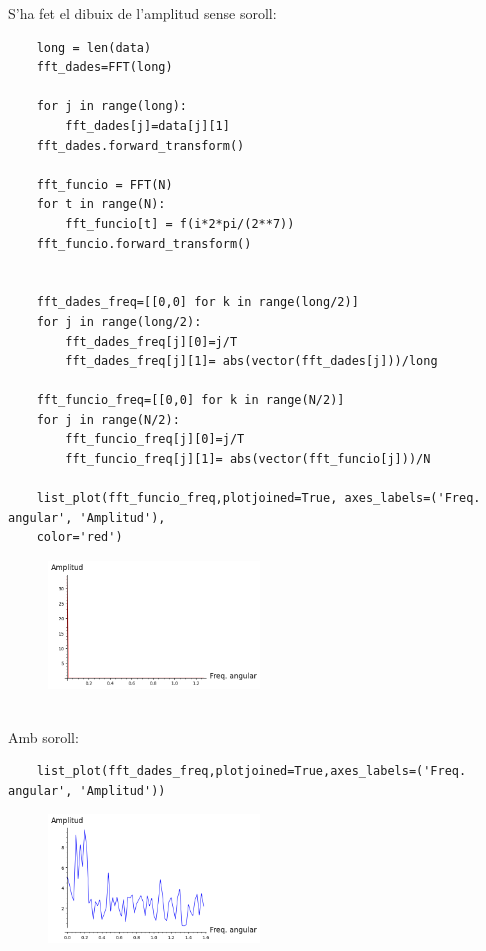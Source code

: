 \documentclass[a4paper, 11pt]{article}
\begin{document}
S'ha fet el dibuix de l'amplitud sense soroll:
\begin{verbatim}
    long = len(data)
    fft_dades=FFT(long)
    
    for j in range(long):
        fft_dades[j]=data[j][1]
    fft_dades.forward_transform()    
        
    fft_funcio = FFT(N)
    for t in range(N):
        fft_funcio[t] = f(i*2*pi/(2**7))
    fft_funcio.forward_transform()
    
    
    fft_dades_freq=[[0,0] for k in range(long/2)]
    for j in range(long/2):
        fft_dades_freq[j][0]=j/T
        fft_dades_freq[j][1]= abs(vector(fft_dades[j]))/long
    
    fft_funcio_freq=[[0,0] for k in range(N/2)]
    for j in range(N/2):
        fft_funcio_freq[j][0]=j/T
        fft_funcio_freq[j][1]= abs(vector(fft_funcio[j]))/N
        
    list_plot(fft_funcio_freq,plotjoined=True, axes_labels=('Freq. angular', 'Amplitud'),
    color='red')
\end{verbatim}
\begin{figure}[h]
\centering
 \includegraphics[width=0.5\textwidth]{meter3.png}
\end{figure}\\
Amb soroll:
\begin{verbatim}
    list_plot(fft_dades_freq,plotjoined=True,axes_labels=('Freq. angular', 'Amplitud'))
\end{verbatim}
\begin{figure}[h]
\centering
 \includegraphics[width=0.5\textwidth]{11.png}
\end{figure}\\
\end{document}
